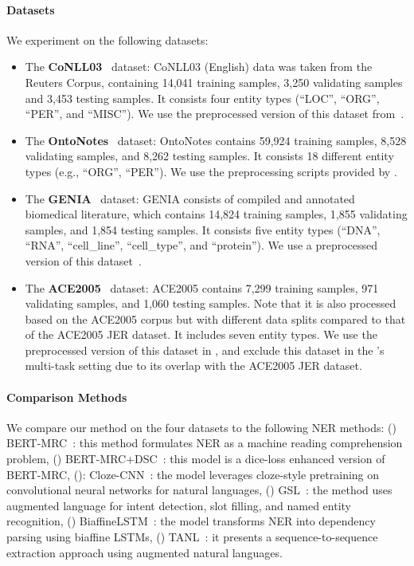 \paragraph{Datasets}
We experiment on the following datasets:
\begin{itemize}
    \item The {\bf CoNLL03}~\citep{tjong-kim-sang-de-meulder-2003-introduction} dataset: CoNLL03 (English) data was taken from the Reuters Corpus, containing 14,041 training samples, 3,250 validating samples and 3,453 testing samples. It consists four entity types (``LOC'', ``ORG'', ``PER'', and ``MISC''). We use the preprocessed version of this dataset from~\cite{li2020unified}.
    \item The {\bf OntoNotes}~\citep{pradhan-etal-2013-towards} dataset: OntoNotes contains 59,924 training samples, 8,528 validating samples, and 8,262 testing samples. It consists 18 different entity types (e.g., ``ORG'', ``PER''). We use the preprocessing scripts provided by \cite{luan2019general}.
    \item The {\bf GENIA}~\citep{10.5555/1289189.1289260} dataset: GENIA consists of compiled and annotated biomedical literature, which contains 14,824 training samples, 1,855 validating samples, and 1,854 testing samples. It consists five entity types (``DNA'', ``RNA'', ``cell\_line'', ``cell\_type'', and ``protein''). We use a preprocessed version of this dataset~\cite{li2020unified}.
    \item The {\bf ACE2005}~\citep{walker2005ace} dataset: ACE2005 contains 7,299 training samples, 971 validating samples, and 1,060 testing samples. Note that it is also processed based on the ACE2005 corpus but with different data splits compared to that of the ACE2005 JER dataset. It includes seven entity types. We use the preprocessed version of this dataset in \cite{li2020unified}, and exclude this dataset in the \method's multi-task setting due to its overlap with the ACE2005 JER dataset.
\end{itemize}

\paragraph{Comparison Methods}
We compare our method \method on the four datasets to the following NER methods: (\expandafter{}) BERT-MRC~\cite{li2020unified}: this method formulates NER as a machine reading comprehension problem, (\expandafter{}) BERT-MRC+DSC~\cite{li2020dice}: this model is a dice-loss enhanced version of BERT-MRC, (\expandafter{}): Cloze-CNN~\cite{baevski2019cloze}: the model leverages cloze-style pretraining on convolutional neural networks for natural languages, (\expandafter{}) GSL~\cite{athiwaratkun2020augmented}: the method uses augmented language for intent detection, slot filling, and named entity recognition, (\expandafter{}) BiaffineLSTM~\cite{yu2020named}: the model transforms NER into dependency parsing using biaffine LSTMs, (\expandafter{}) TANL~\cite{paolini2021structured}: it presents a sequence-to-sequence extraction approach using augmented natural languages.

